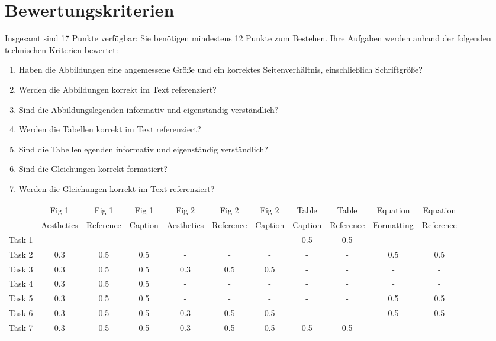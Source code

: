\documentclass[
	german,
	accentcolor=9c,%
	type=intern,
	marginpar=false
	]{tudapub}
\begin{document}
\section{Bewertungskriterien}\label{marking_guide}
Insgesamt sind 17 Punkte verfügbar: Sie benötigen mindestens 12 Punkte zum Bestehen.
Ihre Aufgaben werden anhand der folgenden technischen Kriterien bewertet:
\begin{enumerate}
\item Haben die Abbildungen eine angemessene Größe und ein korrektes Seitenverhältnis, einschließlich Schriftgröße?
\item Werden die Abbildungen korrekt im Text referenziert?
\item Sind die Abbildungslegenden informativ und eigenständig verständlich?
\item Werden die Tabellen korrekt im Text referenziert?
\item Sind die Tabellenlegenden informativ und eigenständig verständlich?
\item Sind die Gleichungen korrekt formatiert?
\item Werden die Gleichungen korrekt im Text referenziert?
\end{enumerate}

\small
\begin{tabular}{cccccccccccc}
\toprule
 & Fig 1 & Fig 1 & Fig 1 & Fig 2 & Fig 2 & Fig 2 & Table & Table & Equation & Equation \\
  & Aesthetics & Reference & Caption & Aesthetics & Reference & Caption & Caption & Reference & Formatting & Reference \\
\midrule
Task 1 & - & - & - & - & - & - & 0.5 & 0.5 & - & - \\
Task 2 & 0.3 & 0.5 & 0.5 & - & - & - & - & - & 0.5 & 0.5 \\
Task 3 & 0.3 & 0.5 & 0.5 & 0.3 & 0.5 & 0.5 & - & - & - & - \\
Task 4 & 0.3 & 0.5 & 0.5 & - & - & - & - & - & - & - \\
Task 5 & 0.3 & 0.5 & 0.5 & - & - & - & - & - & 0.5 & 0.5 \\
Task 6 & 0.3 & 0.5 & 0.5 & 0.3 & 0.5 & 0.5 & - & - & 0.5 & 0.5 \\
Task 7 & 0.3 & 0.5 & 0.5 & 0.3 & 0.5 & 0.5 & 0.5 & 0.5 & - & - \\
\bottomrule
\end{tabular}
\end{document}
